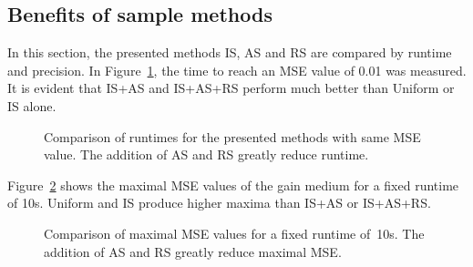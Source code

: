 \subsection{Benefits of sample methods}
In this section, the presented methods IS, AS and RS are compared by
runtime and precision.  In Figure~\ref{graphic:methods_compare}, the
time to reach an MSE value of 0.01 was measured. It is evident that
IS+AS and IS+AS+RS perform much better than Uniform or IS alone.
\begin{figure}[H]
  \centerline{
    }
  \caption{Comparison of runtimes for the presented methods with same
    MSE value.  The addition of AS and RS greatly reduce runtime.}
  \label{graphic:methods_compare}
\end{figure}
Figure~\ref{graphic:methods_compare2} shows the maximal MSE values of
the gain medium for a fixed runtime of 10s. Uniform and IS produce
higher maxima than IS+AS or IS+AS+RS.
\begin{figure}[H]
  \centerline{
    }
  \caption{Comparison of maximal MSE values for a fixed runtime
    of~10s.  The addition of AS and RS greatly reduce maximal MSE.}
  \label{graphic:methods_compare2}
\end{figure}
